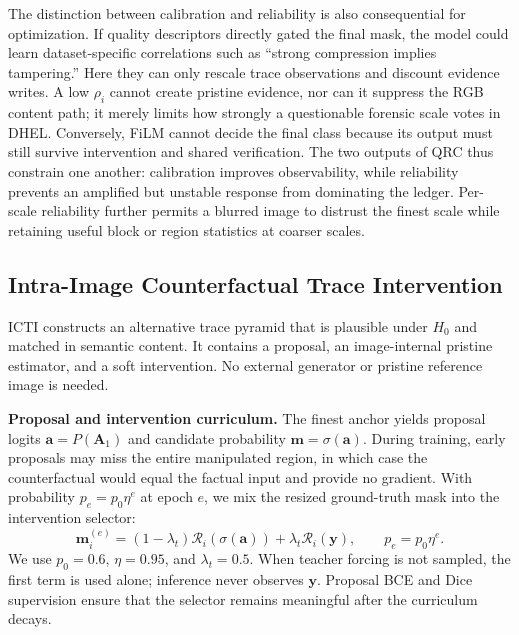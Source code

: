 The distinction between calibration and reliability is also consequential for
optimization. If quality descriptors directly gated the final mask, the model
could learn dataset-specific correlations such as ``strong compression implies
tampering.'' Here they can only rescale trace observations and discount evidence
writes. A low $\rho_i$ cannot create pristine evidence, nor can it suppress the
RGB content path; it merely limits how strongly a questionable forensic scale
votes in DHEL. Conversely, FiLM cannot decide the final class because its output
must still survive intervention and shared verification. The two outputs of QRC
thus constrain one another: calibration improves observability, while reliability
prevents an amplified but unstable response from dominating the ledger. Per-scale
reliability further permits a blurred image to distrust the finest scale while
retaining useful block or region statistics at coarser scales.

\subsection{Intra-Image Counterfactual Trace Intervention}
\label{sec:icti}

ICTI constructs an alternative trace pyramid that is plausible under $H_0$ and
matched in semantic content. It contains a proposal, an image-internal pristine
estimator, and a soft intervention. No external generator or pristine reference
image is needed.

\textbf{Proposal and intervention curriculum.}
The finest anchor yields proposal logits $\mathbf a=P(\mathbf A_1)$ and candidate
probability $\mathbf m=\sigma(\mathbf a)$. During training, early proposals may
miss the entire manipulated region, in which case the counterfactual would equal
the factual input and provide no gradient. With probability $p_e=p_0\eta^e$ at
epoch $e$, we mix the resized ground-truth mask into the intervention selector:
\begin{equation}
\mathbf m_i^{(e)}=(1-\lambda_t)\mathcal R_i(\sigma(\mathbf a))
 +\lambda_t\mathcal R_i(\mathbf y),\qquad p_e=p_0\eta^e.
\label{eq:new_curriculum}
\end{equation}
We use $p_0=0.6$, $\eta=0.95$, and $\lambda_t=0.5$. When teacher forcing is not
sampled, the first term is used alone; inference never observes $\mathbf y$.
Proposal BCE and Dice supervision ensure that the selector remains meaningful
after the curriculum decays.

